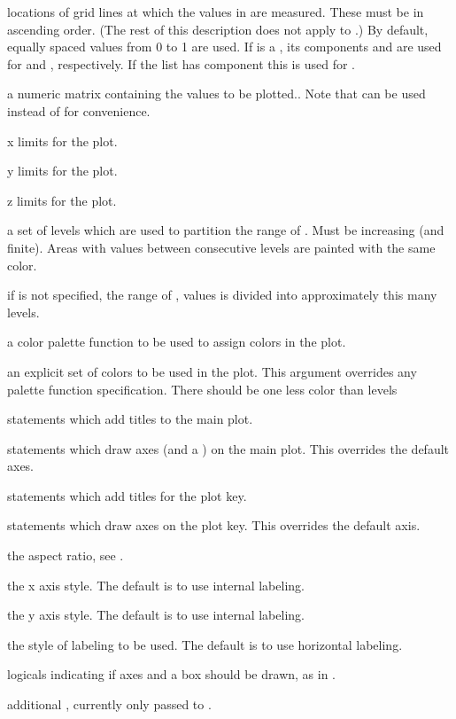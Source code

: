 %
\begin{Arguments}
\begin{ldescription}
\item[\code{x, y}] locations of grid lines at which the values in  are
measured.  These must be in ascending order.  (The rest of this
description does not apply to .)
By default, equally spaced values from 0 to 1 are used.  If 
is a , its components  and  are used
for  and , respectively.  If the list has component
 this is used for .
\item[\code{z}] a numeric matrix containing the values to be plotted..  Note that
 can be used instead of  for convenience.
\item[\code{xlim}] x limits for the plot.
\item[\code{ylim}] y limits for the plot.
\item[\code{zlim}] z limits for the plot.
\item[\code{levels}] a set of levels which are used to partition the range
of .  Must be  increasing (and finite).  Areas
with  values between consecutive levels are painted with the
same color.
\item[\code{nlevels}] if  is not specified, the range of ,
values is divided into approximately this many levels.
\item[\code{color.palette}] a color palette function to be used to assign
colors in the plot.
\item[\code{col}] an explicit set of colors to be used in the plot.
This argument overrides any palette function specification.  There
should be one less color than levels
\item[\code{plot.title}] statements which add titles to the main plot.
\item[\code{plot.axes}] statements which draw axes (and a )
on the main plot.  This overrides the default axes.
\item[\code{key.title}] statements which add titles for the plot key.
\item[\code{key.axes}] statements which draw axes on the plot key.
This overrides the default axis.
\item[\code{asp}] the  aspect ratio, see .
\item[\code{xaxs}] the x axis style.  The default is to use internal
labeling.
\item[\code{yaxs}] the y axis style.  The default is to use internal
labeling.
\item[\code{las}] the style of labeling to be used.  The default is to
use horizontal labeling.
\item[\code{axes, frame.plot}] logicals indicating if axes and a box should be
drawn, as in .
\item[\code{...}] additional , currently only passed to
.
\end{ldescription}
\end{Arguments}
